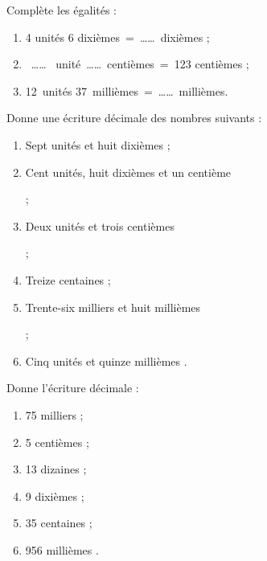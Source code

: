 \begin{exercice}
Complète les égalités :
\begin{enumerate}
 \item 4 unités 6 dixièmes = \ldots \ldots dixièmes ;
 \item  \ldots \ldots  unité \ldots \ldots centièmes = 123 centièmes ;
 \item 12 unités 37 millièmes = \ldots \ldots millièmes.
 \end{enumerate}
\end{exercice}


\begin{exercice}
Donne une écriture décimale des nombres suivants :
\begin{enumerate}
 \item Sept unités et huit dixièmes \dotfill ;
 \item Cent unités, huit dixièmes et un centième
 
 \dotfill ;
 \item Deux unités et trois centièmes
 
 \dotfill ;
 \item Treize centaines \dotfill ;
 \item Trente-six milliers et huit millièmes
 
 \dotfill ;
 \item Cinq unités et quinze millièmes \dotfill.
 \end{enumerate}
\end{exercice}


\begin{exercice}
Donne l'écriture décimale :
\begin{enumerate} 
 \item 75 milliers \dotfill ; 

 \item 5 centièmes \dotfill ; 

 \item 13 dizaines \dotfill ; 

 \item 9 dixièmes \dotfill ; 

 \item 35 centaines \dotfill ;

 \item 956 millièmes \dotfill. 

 \end{enumerate}
\end{exercice}


\newpage    %


